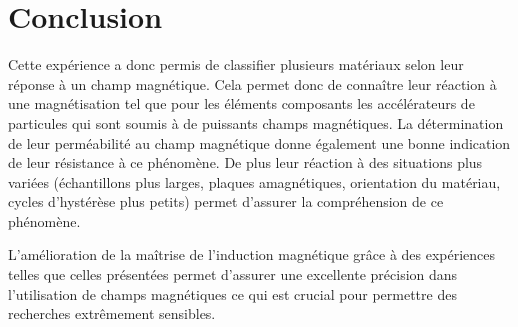 \section{Conclusion}

Cette expérience a donc permis de classifier plusieurs matériaux selon leur réponse à un champ magnétique. Cela permet donc de connaître leur réaction à une magnétisation tel que pour les éléments composants les accélérateurs de particules qui sont soumis à de puissants champs magnétiques. La détermination de leur perméabilité au champ magnétique donne également une bonne indication de leur résistance à ce phénomène. De plus leur réaction à des situations plus variées (échantillons plus larges, plaques amagnétiques, orientation du matériau, cycles d'hystérèse plus petits) permet d'assurer la compréhension de ce phénomène.

L'amélioration de la maîtrise de l'induction magnétique grâce à des expériences telles que celles présentées permet d'assurer une excellente précision dans l'utilisation de champs magnétiques ce qui est crucial pour permettre des recherches extrêmement sensibles.